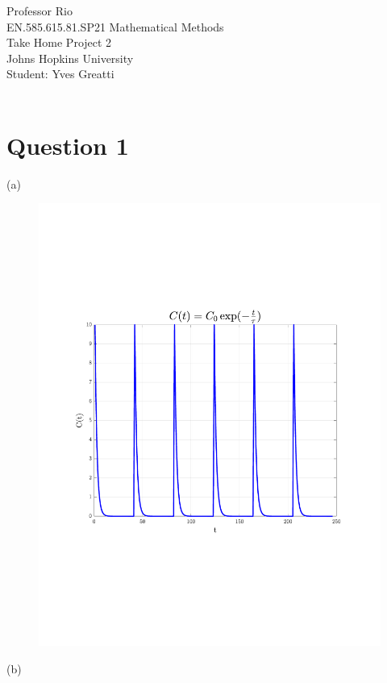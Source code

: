 \documentclass[12pt,twoside]{article}
\begin{document}
\noindent Professor Rio\\
EN.585.615.81.SP21 Mathematical Methods\\
Take Home Project 2\\
Johns Hopkins University\\
Student: Yves Greatti\\\

\section*{Question 1}

\be

\item [(a)]
\begin{figure}[H]
 \centering
 \includegraphics[scale=0.5]{exp_tau}
\end{figure}


\item [(b)]
\end{document}

